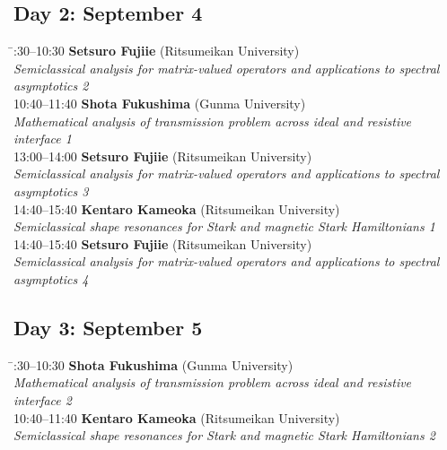 \documentclass[a4paper,11pt]{article}
\numberwithin{equation}{section}
\begin{document}
\subsection*{Day 2: September 4}
\begin{tabbing}
  \hspace{3cm}\=:30--10:30 \> \textbf{Setsuro Fujiie}  (Ritsumeikan University)\\
                \> \emph{Semiclassical analysis for matrix-valued operators
and applications to spectral}\\
               \> \emph{ asymptotics 2}\\

  10:40--11:40 \> \textbf{Shota Fukushima}  (Gunma University)\\
                \> \emph{Mathematical analysis of transmission problem across ideal and resistive}\\
               \> \emph{ interface 1}\\

  13:00--14:00 \> \textbf{Setsuro Fujiie}  (Ritsumeikan University)\\
                \> \emph{Semiclassical analysis for matrix-valued operators
and applications to spectral}\\
               \> \emph{ asymptotics 3}\\

  14:40--15:40 \> \textbf{Kentaro Kameoka}  (Ritsumeikan University)\\
                \> \emph{Semiclassical shape resonances for Stark and magnetic Stark Hamiltonians 1}\\
                
  14:40--15:40 \> \textbf{Setsuro Fujiie}  (Ritsumeikan University)\\
                \> \emph{Semiclassical analysis for matrix-valued operators
and applications to spectral}\\
               \> \emph{ asymptotics 4}
\end{tabbing}

\subsection*{Day 3: September 5}
\begin{tabbing}
  \hspace{3cm}\=:30--10:30 \> \textbf{Shota Fukushima}  (Gunma University)\\
                \> \emph{Mathematical analysis of transmission problem across ideal and resistive}\\
               \> \emph{ interface 2}\\

  10:40--11:40 \> \textbf{Kentaro Kameoka}  (Ritsumeikan University)\\
                \> \emph{Semiclassical shape resonances for Stark and magnetic Stark Hamiltonians 2}
\end{tabbing}
\end{document}
